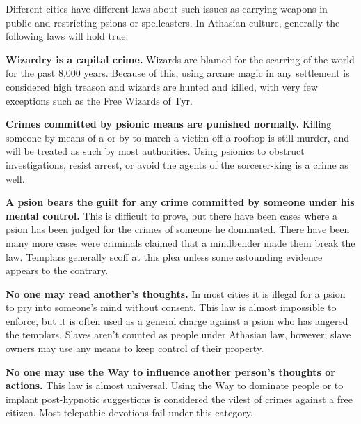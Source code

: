 Different cities have different laws about such issues as carrying weapons in public and restricting psions or spellcasters. In Athasian culture, generally the following laws will hold true.%

\begin{itemize*}
\item \textbf{Wizardry is a capital crime.} Wizards are blamed for the scarring of the world for the past 8,000 years. Because of this, using arcane magic in any settlement is considered high treason and wizards are hunted and killed, with very few exceptions such as the Free Wizards of Tyr.

\item \textbf{Crimes committed by psionic means are punished normally.} Killing someone by means of a  or by  to march a victim off a rooftop is still murder, and will be treated as such by most authorities. Using psionics to obstruct investigations, resist arrest, or avoid the agents of the sorcerer-king is a crime as well.

\item \textbf{A psion bears the guilt for any crime committed by someone under his mental control.} This is difficult to prove, but there have been cases where a psion has been judged for the crimes of someone he dominated. There have been many more cases were criminals claimed that a mindbender made them break the law. Templars generally scoff at this plea unless some astounding evidence appears to the contrary.

\item \textbf{No one may read another's thoughts.} In most cities it is illegal for a psion to pry into someone's mind without consent. This law is almost impossible to enforce, but it is often used as a general charge against a psion who has angered the templars. Slaves aren't counted as people under Athasian law, however; slave owners may use any means to keep control of their property.

\item \textbf{No one may use the Way to influence another person's thoughts or actions.} This law is almost universal. Using the Way to dominate people or to implant post-hypnotic suggestions is considered the vilest of crimes against a free citizen. Most telepathic devotions fail under this category. %


\end{itemize*}
